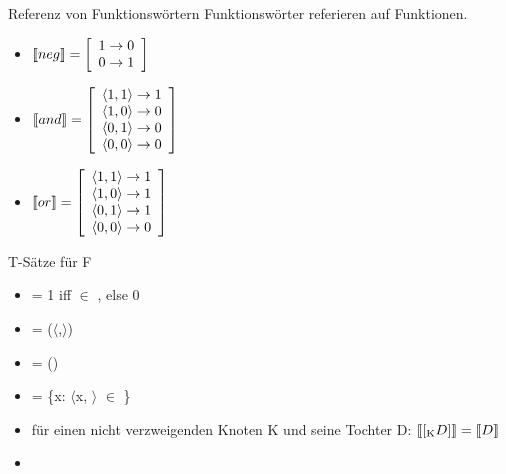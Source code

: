 \begin{frame}
  {Referenz von Funktionswörtern}
  Funktionswörter referieren auf \alert{Funktionen}.\\
  \Zeile
  \begin{itemize}[<+->]
    \item ${\llbracket{}neg\rrbracket} = \left[
                       \begin{array}{l}
                                1 \rightarrow 0\\
                                0 \rightarrow 1
                       \end{array}
                     \right]$ \label{fint01}
    \item ${\llbracket{}and\rrbracket} = \left[
                       \begin{array}{l}
                                \langle 1,1 \rangle \rightarrow 1\\
                                \langle 1,0 \rangle \rightarrow 0\\
                                \langle 0,1 \rangle \rightarrow 0\\
                                \langle 0,0 \rangle \rightarrow 0
                       \end{array}
                       \right]$ \label{fint02}
    \item ${\llbracket{}or\rrbracket} = \left[
                           \begin{array}{l}
                                    \langle 1,1 \rangle \rightarrow 1\\
                                    \langle 1,0 \rangle \rightarrow 1\\
                                    \langle 0,1 \rangle \rightarrow 1\\
                                    \langle 0,0 \rangle \rightarrow 0
                           \end{array}
                           \right]$ \label{fint03}
  \end{itemize}
\end{frame}

\begin{frame}
  {T-Sätze für F}
  \begin{itemize}[<+->]
    \item \den{\alert{[\Sub{S}{ }N{ }VP]}} = 1 iff  $\in$ , else 0 \label{t01}
    \item {} =  ($\langle$,$\rangle$) \label{t02}
    \item {} =  () \label{t03}
    \item {} = \{x: $\langle$x,  $\rangle$ $\in$ \} \label{t04}
      \Halbzeile
    \item für einen nicht verzweigenden Knoten K und seine Tochter D: ${\llbracket{}[_{\text{K}} D]\rrbracket}={\llbracket{}D\rrbracket}$ \label{t05}
      \Halbzeile
    \item {}
  \end{itemize}
\end{frame}

